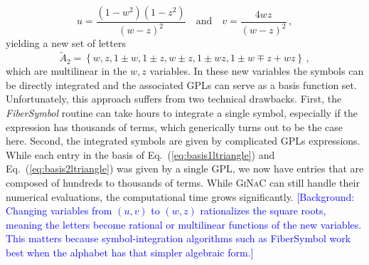 \documentclass[a4paper,11pt]{article}
\begin{document}
\begin{equation}
    u = \frac{(1-w^2)(1-z^2)}{(w-z)^2} \quad \text{and}\quad v=\frac{4 w z}{(w-z)^2} \,,
\end{equation}
yielding a new set of letters
\begin{equation}
    \tilde{A}_2 = \left\{w, z, 1\pm w, 1\pm z, w \pm z, 1 \pm w z, 1 \pm w \mp z + wz\right\} \,,
\end{equation}
which are multilinear in the $w, z$ variables. In these new variables the symbols can be directly integrated and the associated GPLs can serve as a basis function set. Unfortunately, this approach suffers from two technical drawbacks. First, the \textit{FiberSymbol} routine can take hours to integrate a single symbol, especially if the expression has thousands of terms, which generically turns out to be the case here. Second, the integrated symbols are given by complicated GPLs expressions. While each entry in the basis of Eq.~(\ref{eq:basis1ltriangle}) and Eq.~(\ref{eq:basis2ltriangle}) was given by a single GPL, we now have entries that are composed of hundreds to thousands of terms. While \textsc{GiNaC} can still handle their numerical evaluations, the computational time grows significantly.
\textcolor{blue}{\small [Background: Changing variables from $(u,v)$ to $(w,z)$ rationalizes the square roots, meaning the letters become rational or multilinear functions of the new variables. This matters because symbol-integration algorithms such as FiberSymbol work best when the alphabet has that simpler algebraic form.]}
\end{document}
